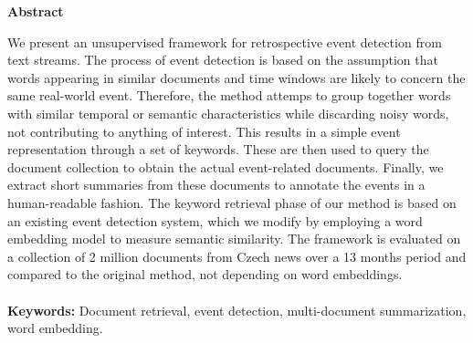 \thispagestyle{plain}

\begin{center}
	\Large
	\textbf{Abstract}
\end{center}

We present an unsupervised framework for retrospective event detection from text streams. The process of event detection is based on the assumption that words appearing in similar documents and time windows are likely to concern the same real-world event. Therefore, the method attemps to group together words with similar temporal or semantic characteristics while discarding noisy words, not contributing to anything of interest. This results in a simple event representation through a set of keywords. These are then used to query the document collection to obtain the actual event-related documents. Finally, we extract short summaries from these documents to annotate the events in a human-readable fashion. The keyword retrieval phase of our method is based on an existing event detection system, which we modify by employing a word embedding model to measure semantic similarity. The framework is evaluated on a collection of 2 million documents from Czech news over a 13 months period and compared to the original method, not depending on word embeddings.
\\
\\
\textbf{Keywords:} Document retrieval, event detection, multi-document summarization, word embedding.